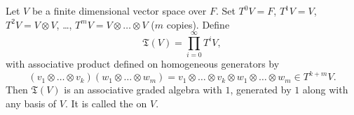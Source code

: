 Let $V$ be a finite dimensional vector space over $F$. Set $T^0V = F$, $T^1V = V$, $T^2V = V \otimes V$, \dots, $T^mV = V \otimes \dots \otimes V$ ($m$ copies). Define
$$
\mathfrak{T}(V) = \prod_{i=0}^{\infty} T^iV,
$$
with associative product defined on homogeneous generators by
$$
(v_1 \otimes \dots \otimes v_k)(w_1 \otimes \dots \otimes w_m) = v_1 \otimes \dots \otimes v_k \otimes w_1 \otimes \dots \otimes w_m \in T^{k+m}V.
$$
Then $\mathfrak{T}(V)$ is an associative graded algebra with $1$, generated by $1$ along with any basis of $V$. It is called the  on $V$.
